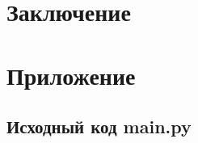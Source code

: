 \documentclass[14pt, a4paper]{extarticle}
\begin{document}
    

    \clearpage
    \section{Заключение}


    \clearpage
    \section{Приложение}
    \subsection{Исходный код main.py}


    \clearpage
    \begin{thebibliography}{}
        \bibitem{}
    \end{thebibliography}
\end{document}
